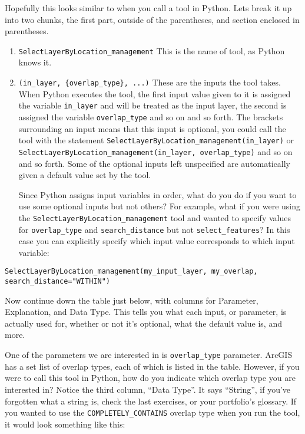 \documentclass{article}
\begin{document}
Hopefully this looks similar to when you call a tool in Python.  Lets break it up into two chunks, the first part, outside of the parentheses, and section enclosed in parentheses.
\begin{enumerate}
    \item \texttt{SelectLayerByLocation\_management} This is the name of tool, as Python knows it. 
    \item \texttt{(in\_layer, \{overlap\_type\}, ...)} These are the inputs the tool takes.  When Python executes the tool, the first input value given to it is assigned the variable \texttt{in\_layer} and will be treated as the input layer, the second is assigned the variable \texttt{overlap\_type} and so on and so forth.  The brackets surrounding an input means that this input is optional, you could call the tool with the statement \texttt{SelectLayerByLocation\_management(in\_layer)} or \texttt{SelectLayerByLocation\_management(in\_layer, overlap\_type)} 
        and so on and so forth.  Some of the optional inputs left unspecified are automatically given a default value set by the tool.

    Since Python assigns input variables in order, what do you do if you want to use some optional inputs but not others?  For example, what if you were using the \texttt{SelectLayerByLocation\_management} tool and wanted to specify values for \texttt{overlap\_type} and \texttt{search\_distance} but not \texttt{select\_features}?  In this case you can explicitly specify which input value corresponds to which input variable: 

\end{enumerate}
\noindent    \texttt{SelectLayerByLocation\_management(my\_input\_layer, my\_overlap, search\_distance="WITHIN")}
\vspace{2mm}

Now continue down the table just below, with columns for Parameter, Explanation, and Data Type.  This tells you what each input, or parameter,  is actually used for, whether or not it's optional, what the default value is, and more.

One of the parameters we are interested in is \texttt{overlap\_type} parameter.  ArcGIS has a set list of overlap types, each of which is listed in the table.  However, if you were to call this tool in Python, how do you indicate which overlap type you are interested in?  Notice the third column, ``Data Type''.  It says ``String'', if you've forgotten what a string is, check the last exercises, or your portfolio's glossary.  If you wanted to use the \texttt{COMPLETELY\_CONTAINS} overlap type when you run the tool, it would look something like this: 
\end{document}
